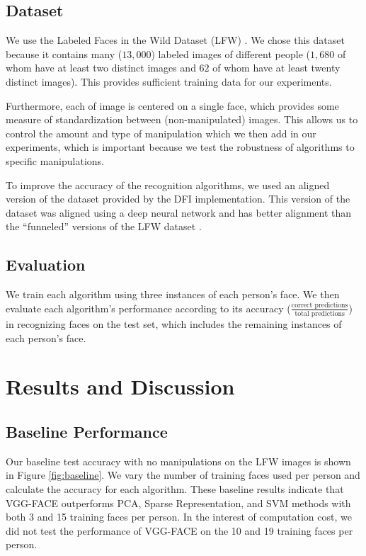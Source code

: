 \documentclass[pageno]{cos429}
\begin{document}
\subsection{Dataset}\label{sec:data}
We use the Labeled Faces in the Wild Dataset (LFW) \cite{huang_labeled_2007}. We chose this dataset because it contains many ($13,000$) labeled images of different people ($1,680$ of whom have at least two distinct images and $62$ of whom have at least twenty distinct images). This provides sufficient training data for our experiments.

Furthermore, each of image is centered on a single face, which provides some measure of standardization between (non-manipulated) images. This allows us to control the amount and type of manipulation which we then add in our experiments, which is important because we test the robustness of algorithms to specific manipulations.

To improve the accuracy of the recognition algorithms, we used an aligned version of the dataset provided by the DFI implementation. This version of the dataset was aligned using a deep neural network and has better alignment than the ``funneled'' versions of the LFW dataset \cite{noauthor_lfw_nodate}.

\subsection{Evaluation}
We train each algorithm using three instances of each person's face. We then evaluate each algorithm's performance according to its accuracy ($\frac{\textrm{correct predictions}}{\textrm{total predictions}}$) in recognizing faces on the test set, which includes the remaining instances of each person's face.

\section{Results and Discussion}
\subsection*{Baseline Performance}
Our baseline test accuracy with no manipulations on the LFW images is shown in Figure \ref{fig:baseline}. We vary the number of training faces used per person and calculate the accuracy for each algorithm. These baseline results indicate that VGG-FACE outperforms PCA, Sparse Representation, and SVM methods with both 3 and 15 training faces per person. In the interest of computation cost, we did not test the performance of VGG-FACE on the 10 and 19 training faces per person.
\end{document}
